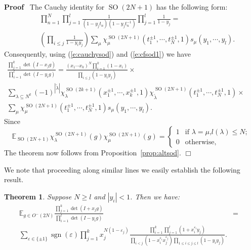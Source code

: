 \documentclass[11pt]{amsart}
\newcommand{\tmop}[1]{\ensuremath{\operatorname{#1}}}
\renewenvironment{proof}{
\noindent\textbf{Proof}\ }{\hspace*{\fill}
\begin{math}\Box\end{math}\medskip}
\newtheorem{theorem}{Theorem}
\begin{document}
\begin{proof}
  The Cauchy identity for $\tmop{SO} ( 2 N + 1 )$ has the following form:
  \begin{eqnarray}
    &&\prod_{n = 1}^N \prod_{j = 1}^l \frac{1}{( 1 - y_j t_n ) ( 1 - y_j t_n^{-
    1} )} \prod_{j = 1}^l \frac{1}{1 - y_j} =  \nonumber\\&&
    \left( \prod_{i \leqslant j} \frac{1}{1 - y_i y_j} \right) \sum_{\mu}
    \chi_{\mu}^{\tmop{SO} ( 2 N + 1 )} ( t_1^{\pm 1}, \cdots, t_N^{\pm 1}, 1 )
    s_{\mu} ( y_1, \cdots, y_l ) .  \label{e:cauchysod}
  \end{eqnarray}
  Consequently, using (\ref{e:cauchysod}) and (\ref{e:cfsod1}) we have
  \begin{eqnarray*}
    \frac{\prod_{j = 1}^k \det ( I - x_j g )}{\prod_{i = 1}^l \det ( I - y_i g
    )} = \frac{( x_1 \cdots x_k )^N \prod_{i = 1}^k ( 1 - x_i )}{\prod_{i
    \leqslant j} ( 1 - y_i y_j )} \times &  & \\
    \sum_{\lambda \subseteq N^k} ( - 1 )^{| \tilde{\lambda} |}
    \chi_{\lambda}^{\tmop{SO} ( 2 k + 1 )} ( x_1^{\pm 1}, \cdots, x_k^{\pm 1},
    1 ) \chi_{\tilde{\lambda}}^{\tmop{SO} ( 2 N + 1 )} ( t_1^{\pm 1}, \cdots,
    t_N^{\pm 1}, 1 ) \times &  & \\
    \sum_{\mu} \chi_{\mu}^{\tmop{SO} ( 2 N + 1 )} ( t_1^{\pm 1}, \cdots,
    t_N^{\pm 1}, 1 ) s_{\mu} ( y_1, \cdots, y_l ) . &  &
  \end{eqnarray*}
  Since
  \[ \mathbb{E}_{\tmop{SO} ( 2 N + 1 )} \chi_{\lambda}^{\tmop{SO} ( 2 N + 1 )}
     ( g ) \chi_{\mu}^{\tmop{SO} ( 2 N + 1 )} ( g ) = \left\{\begin{array}{ll}
       1 & \text{if $\lambda = \mu$,} l ( \lambda ) \leqslant N ;\\
       0 & \text{otherwise,}
     \end{array}\right. \]
  The theorem now follows from Proposition~\ref{prop:altsod}.
\end{proof}

We note that proceeding along similar lines we easily establish
the following result.

\begin{theorem}
  \label{thm:o3}Suppose $N \geqslant l$ and $|y_i| <1$. Then we
  have:
  \begin{eqnarray*}
    \mathbb{E}_{g \in O^- ( 2 N )} \frac{\prod_{j = 1}^k \det ( I + x_j g
    )}{\prod_{i = 1}^l \det ( I - y_i g )} & = & \\
    \sum_{\varepsilon \in \{ \pm 1 \}} \tmop{sgn} ( \varepsilon ) \prod_{j =
    1}^k x_j^{N ( 1 - \varepsilon_j )} \frac{\prod_{i = 1}^k \prod_{j = 1}^l (
    1 + x_i^{\varepsilon_i} y_j )}{\prod_{i < j} ( 1 - x_i^{\varepsilon_i}
    x_j^{\varepsilon_j} ) \prod_{1 \leqslant i \leqslant j \leqslant l} ( 1 -
    y_i y_j )} . &  &
  \end{eqnarray*}

\end{theorem}
\end{document}
